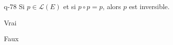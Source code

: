 \begin{truefalse}{q-78}
Si $p\in \mathcal{L}(E)$ et si $p \circ p = p$, alors $p$ est inversible.
\item Vrai
\item* Faux
\end{truefalse}

